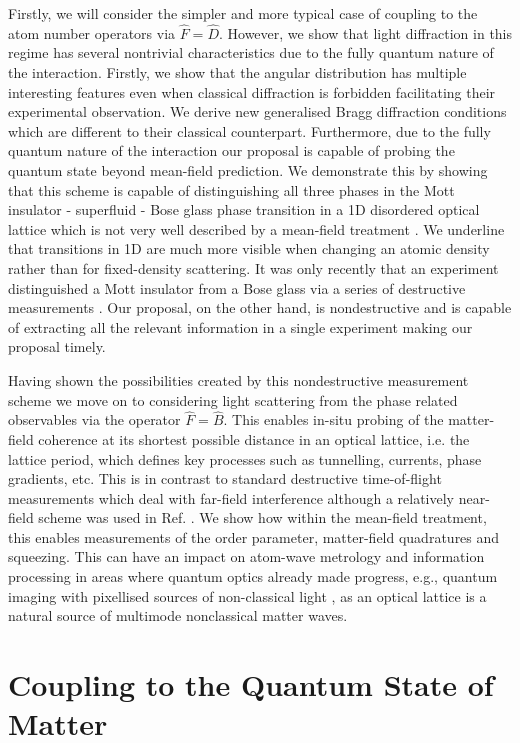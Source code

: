 Firstly, we will consider the simpler and more typical case of
coupling to the atom number operators via $\hat{F} =
\hat{D}$. However, we show that light diffraction in this regime has
several nontrivial characteristics due to the fully quantum nature of
the interaction. Firstly, we show that the angular distribution has
multiple interesting features even when classical diffraction is
forbidden facilitating their experimental observation. We derive new
generalised Bragg diffraction conditions which are different to their
classical counterpart. Furthermore, due to the fully quantum nature of
the interaction our proposal is capable of probing the quantum state
beyond mean-field prediction. We demonstrate this by showing that this
scheme is capable of distinguishing all three phases in the Mott
insulator - superfluid - Bose glass phase transition in a 1D
disordered optical lattice which is not very well described by a
mean-field treatment \cite{cazalilla2011, ejima2011, kuhner2000,
  pino2012, pino2013}. We underline that transitions in 1D are much
more visible when changing an atomic density rather than for
fixed-density scattering. It was only recently that an experiment
distinguished a Mott insulator from a Bose glass via a series of
destructive measurements \cite{derrico2014}. Our proposal, on the
other hand, is nondestructive and is capable of extracting all the
relevant information in a single experiment making our proposal
timely.

Having shown the possibilities created by this nondestructive
measurement scheme we move on to considering light scattering from the
phase related observables via the operator $\hat{F} = \hat{B}$. This
enables in-situ probing of the matter-field coherence at its shortest
possible distance in an optical lattice, i.e. the lattice period,
which defines key processes such as tunnelling, currents, phase
gradients, etc. This is in contrast to standard destructive
time-of-flight measurements which deal with far-field interference
although a relatively near-field scheme was used in
Ref. \cite{miyake2011}. We show how within the mean-field treatment,
this enables measurements of the order parameter, matter-field
quadratures and squeezing. This can have an impact on atom-wave
metrology and information processing in areas where quantum optics
already made progress, e.g., quantum imaging with pixellised sources
of non-classical light \cite{golubev2010, kolobov1999}, as an optical
lattice is a natural source of multimode nonclassical matter waves.

\section{Coupling to the Quantum State of Matter}

